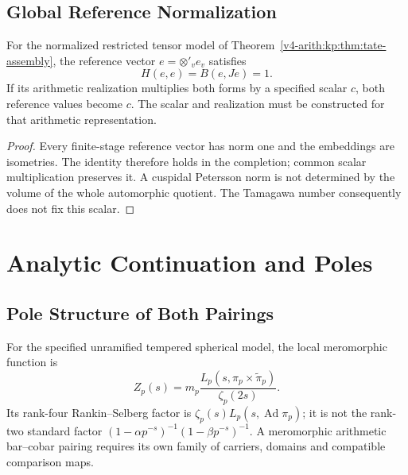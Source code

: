 \subsection{Global Reference Normalization}
\label{v4-arith:kp:spherical-calc:global}
\begin{proposition}
\label{v4-arith:kp:prop:global-spherical-match}
For the normalized restricted tensor model of
Theorem~\ref{v4-arith:kp:thm:tate-assembly}, the reference vector
\(e=\otimes'_v e_v\) satisfies
\begin{equation}
\label{v4-arith:kp:eq:global-spherical-match}
 H(e,e)=B(e,Je)=1.
\end{equation}
If its arithmetic realization multiplies both forms by a specified
scalar \(c\), both reference values become \(c\). The scalar and
realization must be constructed for that arithmetic representation.
\end{proposition}
\begin{proof}
Every finite-stage reference vector has norm one and the embeddings
are isometries. The identity therefore holds in the completion;
common scalar multiplication preserves it. A cuspidal Petersson norm
is not determined by the volume of the whole automorphic quotient.
The Tamagawa number consequently does not fix this scalar.
\end{proof}

\section{Analytic Continuation and Poles}
\label{v4-arith:kp:analytic-cont}

\subsection{Pole Structure of Both Pairings}
\label{v4-arith:kp:analytic-cont:poles}

For the specified unramified tempered spherical model, the local
meromorphic function is
\[
 Z_p(s)=m_p\frac{L_p(s,\pi_p\times\widetilde\pi_p)}{\zeta_p(2s)}.
\]
Its rank-four Rankin--Selberg factor is
\(\zeta_p(s)L_p(s,\operatorname{Ad}\pi_p)\); it is not the
rank-two standard factor
\((1-\alpha p^{-s})^{-1}(1-\beta p^{-s})^{-1}\).
A meromorphic arithmetic bar--cobar pairing requires its own family
of carriers, domains and compatible comparison maps.

